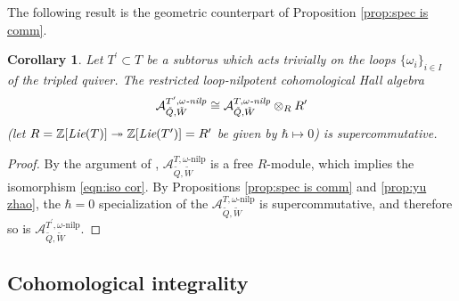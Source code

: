 \documentclass{amsart}
\newtheorem{corollary}[theorem]{Corollary}
\def\BZ{{\mathbb{Z}}}
\def\tQ{\tilde{Q}}
\def\tW{\tilde{W}}
\def\kha{\mathcal{A}^{T,\omega\text{-nilp}}_{\tQ,\tW}}
\def\ekha{\mathcal{A}^{T,\omega\emph{-nilp}}_{\tQ,\tW}}
\begin{document}
\medskip 

\noindent The following result is the geometric counterpart of Proposition \ref{prop:spec is comm}.

\medskip 

\begin{corollary} \label{nilCoHAcommute}
Let $T^{\prime} \subset T$ be a subtorus which acts trivially on the loops $\{\omega_i\}_{i \in I}$ of the tripled quiver. The restricted loop-nilpotent cohomological Hall algebra 
\begin{equation}
\label{eqn:iso cor}
\mathcal{A}^{T^{\prime},\omega\emph{-nilp}}_{\tilde{Q},\tilde{W}} \cong \ekha \otimes_{R} R'
\end{equation}
(let $R = \BZ[\emph{Lie}(T)] \twoheadrightarrow \BZ[\emph{Lie}(T')] = R'$ be given by $\hbar \mapsto 0$) is supercommutative.  
\end{corollary}

\medskip 

\begin{proof} By the argument of \cite[Proposition 6.9]{JNCoulomb}, $\mathcal{A}^{T, \omega\text{-nilp}}_{\tilde{Q},\tilde{W}}$ is a free $R$-module, which implies the isomorphism \eqref{eqn:iso cor}. By Propositions \ref{prop:spec is comm} and \ref{prop:yu zhao}, the $\hbar = 0$ specialization of the $\kha$ is supercommutative, and therefore so is $\mathcal{A}^{T^{\prime},\omega\text{-nilp}}_{\tilde{Q},\tilde{W}}$. \end{proof}

\medskip 

\subsection{Cohomological integrality}
\label{sub:cohomological integrality} 
\end{document}
